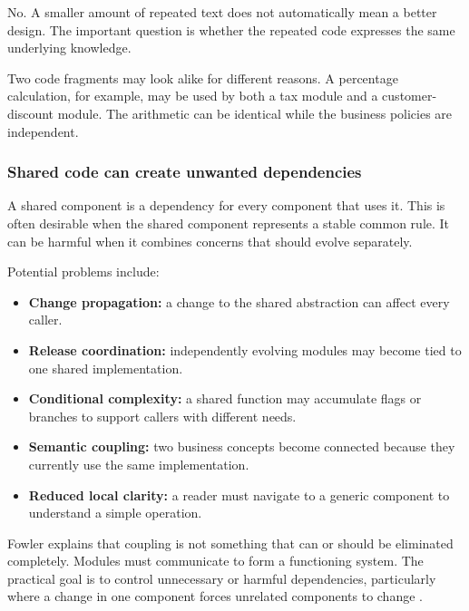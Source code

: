 \documentclass[12pt,a4paper]{article}
\begin{document}
No. A smaller amount of repeated text does not automatically mean a better design. The important question is whether the repeated code expresses the same underlying knowledge.

Two code fragments may look alike for different reasons. A percentage calculation, for example, may be used by both a tax module and a customer-discount module. The arithmetic can be identical while the business policies are independent.

\subsubsection{Shared code can create unwanted dependencies}

A shared component is a dependency for every component that uses it. This is often desirable when the shared component represents a stable common rule. It can be harmful when it combines concerns that should evolve separately.

Potential problems include:

\begin{itemize}

\item \textbf{Change propagation:} a change to the shared abstraction can affect every caller.

\item \textbf{Release coordination:} independently evolving modules may become tied to one shared implementation.

\item \textbf{Conditional complexity:} a shared function may accumulate flags or branches to support callers with different needs.

\item \textbf{Semantic coupling:} two business concepts become connected because they currently use the same implementation.

\item \textbf{Reduced local clarity:} a reader must navigate to a generic component to understand a simple operation.

\end{itemize}

Fowler explains that coupling is not something that can or should be eliminated completely. Modules must communicate to form a functioning system. The practical goal is to control unnecessary or harmful dependencies, particularly where a change in one component forces unrelated components to change \cite{fowler2001coupling}.
\end{document}
